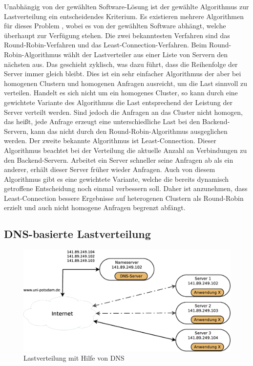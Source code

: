 \documentclass[a4paper, 12pt, BCOR10mm, DIV12, toc=bibliography, toc=listof, german]{scrbook}
\begin{document}
			Unabhängig von der gewählten Software-Lösung ist der gewählte Algorithmus zur Lastverteilung
			ein entscheidendes Kriterium. Es existieren mehrere Algorithmen für dieses Problem
			\cite{zinke2007}, wobei es von der gewählten Software abhängt, welche überhaupt zur Verfügung
			stehen.  Die zwei bekanntesten Verfahren sind das Round-Robin-Verfahren und das
			Least-Connection-Verfahren. Beim Round-Robin-Algorithmus wählt der Lastverteiler aus einer
			Liste von Servern den nächsten aus. Das geschieht zyklisch, was dazu führt, dass die
			Reihenfolge der Server immer gleich bleibt. Dies ist ein sehr einfacher Algorithmus der aber
			bei homogenen Clustern und homogenen Anfragen ausreicht, um die Last sinnvoll zu verteilen.
			Handelt es sich nicht um ein homogenes Cluster, so kann durch eine gewichtete Variante des
			Algorithmus die Last entsprechend der Leistung der Server verteilt werden. Sind jedoch die
			Anfragen an das Cluster nicht homogen, das heißt, jede Anfrage erzeugt eine unterschiedliche
			Last bei den Backend-Servern, kann das nicht durch den Round-Robin-Algorithmus ausgeglichen
			werden. Der zweite bekannte Algorithmus ist Least-Connection. Dieser Algorithmus beachtet bei
			der Verteilung die aktuelle Anzahl an Verbindungen zu den Backend-Servern. Arbeitet ein Server
			schneller seine Anfragen ab als ein anderer, erhält dieser Server früher wieder
			Anfragen. Auch von diesem Algorithmus gibt es eine gewichtete Variante, welche die bereits
			dynamisch getroffene Entscheidung noch einmal verbessern soll. Daher ist anzunehmen, dass
			Least-Connection bessere Ergebnisse auf heterogenen Clustern als Round-Robin erzielt und auch
			nicht homogene Anfragen begrenzt abfängt.


			\subsection{DNS-basierte Lastverteilung} %
			\label{sub:dns-lastverteilung}

			\begin{figure}
				\centering
				\includegraphics[width=12cm]{images/dns-loadbalancer}
				\caption{Lastverteilung mit Hilfe von DNS}
				\label{fig:lastverteilung-dns}
			\end{figure}
\end{document}

